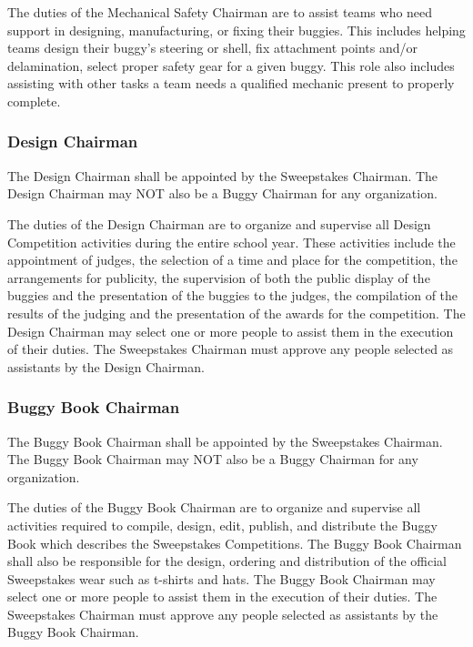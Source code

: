 	The duties of the Mechanical Safety Chairman are to assist teams who need support in designing, manufacturing, or fixing their buggies. This includes helping teams design their buggy’s steering or shell, fix attachment points and/or delamination, select proper safety gear for a given buggy. This role also includes assisting with other tasks a team needs a qualified mechanic present to properly complete.

\subsubsection{Design Chairman}

	The Design Chairman shall be appointed by the Sweepstakes Chairman. The Design Chairman may NOT also be a Buggy Chairman for any organization.

	The duties of the Design Chairman are to organize and supervise all Design Competition activities during the entire school year. These activities include the appointment of judges, the selection of a time and place for the competition, the arrangements for publicity, the supervision of both the public display of the buggies and the presentation of the buggies to the judges, the compilation of the results of the judging and the presentation of the awards for the competition. The Design Chairman may select one or more people to assist them in the execution of their duties. The Sweepstakes Chairman must approve any people selected as assistants by the Design Chairman.

\subsubsection{Buggy Book Chairman}

	The Buggy Book Chairman shall be appointed by the Sweepstakes Chairman. The Buggy Book Chairman may NOT also be a Buggy Chairman for any organization.

	The duties of the Buggy Book Chairman are to organize and supervise all activities required to compile, design, edit, publish, and distribute the Buggy Book which describes the Sweepstakes Competitions. The Buggy Book Chairman shall also be responsible for the design, ordering and distribution of the official Sweepstakes wear such as t-shirts and hats. The Buggy Book Chairman may select one or more people to assist them in the execution of their duties. The Sweepstakes Chairman must approve any people selected as assistants by the Buggy Book Chairman.

